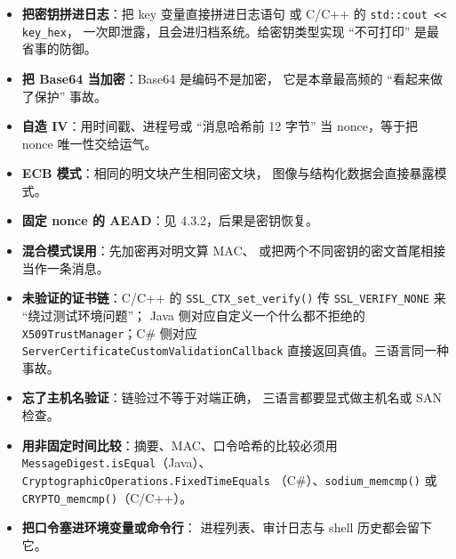 \documentclass[12pt,a4paper,fontset=fandol]{ctexbook}
\newcommand{\Fn}[1]{\texttt{#1()}}
\newcommand{\Tp}[1]{\texttt{#1}}
\newcommand{\CSharp}{C\#}
\newcommand{\CppJava}{C/C++}
\begin{document}
\begin{warning}[title=十种最常见的密钥材料事故]
\begin{itemize}
  \item \textbf{把密钥拼进日志}：把 key 变量直接拼进日志语句
        或 \CppJava{} 的 \texttt{std::cout << key\_hex}，
        一次即泄露，且会进归档系统。给密钥类型实现
        ``不可打印'' 是最省事的防御。
  \item \textbf{把 Base64 当加密}：Base64 是编码不是加密，
        它是本章最高频的 ``看起来做了保护'' 事故。
  \item \textbf{自造 IV}：用时间戳、进程号或 ``消息哈希前 12 字节''
        当 nonce，等于把 nonce 唯一性交给运气。
  \item \textbf{ECB 模式}：相同的明文块产生相同密文块，
        图像与结构化数据会直接暴露模式。
  \item \textbf{固定 nonce 的 AEAD}：见 4.3.2，后果是密钥恢复。
  \item \textbf{混合模式误用}：先加密再对明文算 MAC、
        或把两个不同密钥的密文首尾相接当作一条消息。
  \item \textbf{未验证的证书链}：\CppJava{} 的
        \Fn{SSL\_\allowbreak{}CTX\_\allowbreak{}set\_\allowbreak{}verify} 传
        \Tp{SSL\_\allowbreak{}VERIFY\_\allowbreak{}NONE} 来 ``绕过测试环境问题''；
        Java 侧对应自定义一个什么都不拒绝的
        \Tp{X509\allowbreak{}Trust\allowbreak{}Manager}；\CSharp{} 侧对应
        \Tp{Server\allowbreak{}Certificate\allowbreak{}Custom\allowbreak{}Validation\allowbreak{}Callback}
        直接返回真值。三语言同一种事故。
  \item \textbf{忘了主机名验证}：链验过不等于对端正确，
        三语言都要显式做主机名或 SAN 检查。
  \item \textbf{用非固定时间比较}：摘要、MAC、口令哈希的比较必须用
        \Tp{Message\allowbreak{}Digest.\allowbreak is\allowbreak{}Equal}（Java）、
        \Tp{Cryptographic\allowbreak Operations.Fixed\allowbreak{}Time\allowbreak{}Equals}
        （\CSharp{}）、\Fn{sodium\_\allowbreak{}memcmp} 或
        \Fn{CRYPTO\_\allowbreak{}memcmp}（\CppJava{}）。
  \item \textbf{把口令塞进环境变量或命令行}：
        进程列表、审计日志与 shell 历史都会留下它。
\end{itemize}
\end{warning}
\end{document}
